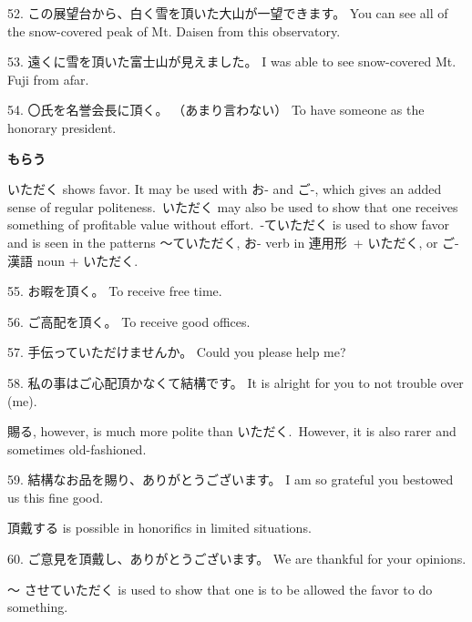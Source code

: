 \par{52. この展望台から、白く雪を頂いた大山が一望できます。 \hfill\break
You can see all of the snow-covered peak of Mt. Daisen from this observatory. }

\par{53. 遠くに雪を頂いた富士山が見えました。 \hfill\break
I was able to see snow-covered Mt. Fuji from afar. }

\par{54. 〇氏を名誉会長に頂く。 （あまり言わない） \hfill\break
To have someone as the honorary president. }

\par{\textbf{もらう }}

\par{いただく shows  favor. It may be used with お- and ご-,  which gives an added sense of regular   politeness. いただく may also be used to show that one receives something of profitable value without effort. -ていただく is used to show favor and is seen in the patterns ～ていただく, お- verb in 連用形 + いただく, or ご- 漢語 noun + いただく. }
 
\par{55. お暇を頂く。 \hfill\break
To receive free time. }

\par{56. ご高配を頂く。 \hfill\break
To receive good offices. }

\par{57. 手伝っていただけませんか。 \hfill\break
Could you please help me? }

\par{58. 私の事はご心配頂かなくて結構です。 \hfill\break
It is alright for you to not trouble over (me). }

\par{ 賜る, however, is much more polite than いただく. However, it is also rarer and sometimes old-fashioned. }

\par{59. 結構なお品を賜り、ありがとうございます。 \hfill\break
I am so grateful you bestowed us this fine good. }

\par{ 頂戴する is possible in honorifics in limited situations. }

\par{60. ご意見を頂戴し、ありがとうございます。 \hfill\break
We are thankful for your opinions. }

\par{～ させていただく is used  to show that one is to be allowed the favor to do something. }

